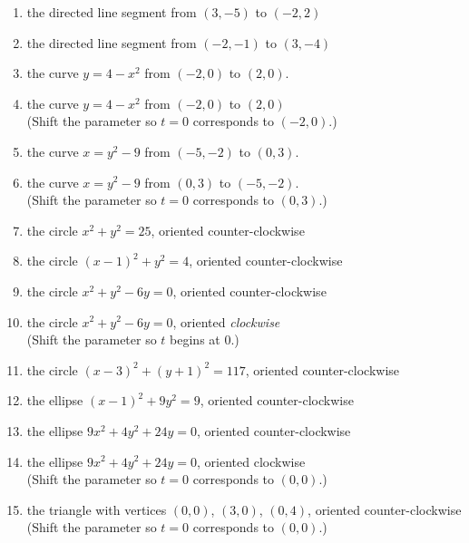 \begin{enumerate}

\setcounter{enumi}{\value{HW}}

\item  the directed line segment from $(3,-5)$ to $(-2,2)$ \label{findparamfirst}

\item  the directed line segment from $(-2,-1)$ to $(3, -4)$ 

\item  the curve $y = 4-x^2$ from $(-2,0)$ to $(2,0)$.

\item   the curve $y = 4-x^2$ from $(-2,0)$ to $(2,0)$ \\
(Shift the parameter so  $t=0$ corresponds to $(-2,0)$.)

\item  the curve $x = y^2 - 9$ from $(-5,-2)$ to $(0,3)$.

\item  the curve $x = y^2 - 9$ from $(0,3)$ to $(-5,-2)$.\\
(Shift the parameter so  $t=0$ corresponds to $(0,3)$.)

\item   the circle $x^2 + y^2 = 25$, oriented counter-clockwise

\item   the circle $(x-1)^2 + y^2 = 4$, oriented counter-clockwise

\item   the circle $x^2 + y^2 - 6y = 0$, oriented counter-clockwise

\item   the circle $x^2 + y^2 - 6y = 0$, oriented \emph{clockwise}\\
(Shift the parameter so  $t$ begins at $0$.)

\item   the circle $(x-3)^2 + (y+1)^2 = 117$, oriented counter-clockwise

\item   the ellipse $(x-1)^2 + 9y^2 = 9$, oriented counter-clockwise

\item   the ellipse $9x^2 + 4y^2 + 24y =0$, oriented counter-clockwise

\item   the ellipse $9x^2 + 4y^2 + 24y =0$, oriented clockwise  \\
(Shift the parameter so $t=0$ corresponds to  $(0,0)$.)

\item  the triangle with vertices $(0,0)$, $(3,0)$, $(0,4)$, oriented counter-clockwise \\
(Shift the parameter so $t=0$ corresponds to $(0,0)$.) \label{findparamlast}

\setcounter{HW}{\value{enumi}}

\end{enumerate}

